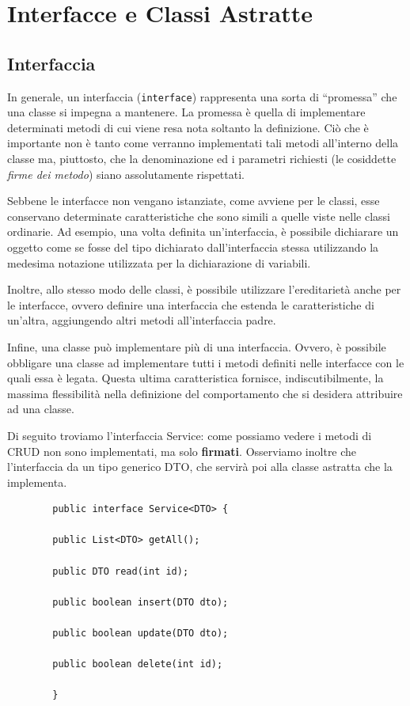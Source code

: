 \documentclass[a4paper,12 pt]{article}
\begin{document}
\section{Interfacce e Classi Astratte}
	
	\subsection{Interfaccia}
	In generale, un interfaccia (\texttt{interface}) rappresenta una sorta di “promessa” che una classe si impegna a mantenere. La promessa è quella di implementare determinati metodi di cui viene resa nota soltanto la definizione. Ciò che è importante non è tanto come verranno implementati tali metodi all’interno della classe ma, piuttosto, che la denominazione ed i parametri richiesti (le cosiddette \textit{firme dei metodo}) siano assolutamente rispettati.
	
	Sebbene le interfacce non vengano istanziate, come avviene per le classi, esse conservano determinate caratteristiche che sono simili a quelle viste nelle classi ordinarie. Ad esempio, una volta definita un’interfaccia, è possibile dichiarare un oggetto come se fosse del tipo dichiarato dall’interfaccia stessa utilizzando la medesima notazione utilizzata per la dichiarazione di variabili.
	
	Inoltre, allo stesso modo delle classi, è possibile utilizzare l’ereditarietà anche per le interfacce, ovvero definire una interfaccia che estenda le caratteristiche di un’altra, aggiungendo altri metodi all’interfaccia padre.
	
	Infine, una classe può implementare più di una interfaccia. Ovvero, è possibile obbligare una classe ad implementare tutti i metodi definiti nelle interfacce con le quali essa è legata. Questa ultima caratteristica fornisce, indiscutibilmente, la massima flessibilità nella definizione del comportamento che si desidera attribuire ad una classe.
	
	Di seguito troviamo l'interfaccia Service: come possiamo vedere i metodi di CRUD non sono implementati, ma solo \textbf{firmati}. Osserviamo inoltre che l'interfaccia da un tipo generico DTO, che servirà poi alla classe astratta che la implementa.
	
	\begin{lstlisting}
		public interface Service<DTO> {
		
		public List<DTO> getAll();
		
		public DTO read(int id);
		
		public boolean insert(DTO dto);
		
		public boolean update(DTO dto);
		
		public boolean delete(int id);
		
		}
		
	\end{lstlisting}
	
\end{document}
